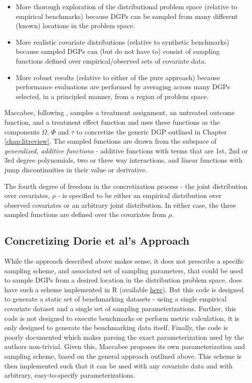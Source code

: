 \documentclass[../main.tex]{subfiles}
\begin{document}
\begin{itemize}
    \item More thorough exploration of the distributional problem space (relative to empirical benchmarks) because DGPs can be sampled from many different (known) locations in the problem space.
    
    \item More realistic covariate distributions (relative to synthetic benchmarks) because sampled DGPs can (but do not have to) consist of sampling functions defined over empirical/observed sets of covariate data.
    
    \item More robust results (relative to either of the pure approach) because performance evaluations are performed by averaging across many DGPs selected, in a principled manner, from a region of problem space.
\end{itemize}

Maccabee, following \cite{Dorie2019Automated1}, samples a treatment assignment, an untreated outcome function, and a treatment effect function and uses these functions as the components $\Omega$, $\Phi$ and $\tau$ to concretize the generic DGP outlined in Chapter \ref{chap:litreview}. The sampled functions are drawn from the subspace of \textit{generalized, additive functions} - additive functions with terms that are 1st, 2nd or 3rd degree polynomials, two or three way interactions, and linear functions with jump discontinuities in their value or derivative.

\vspace{\baselineskip}

The fourth degree of freedom in the concretization process - the joint distribution over covariates, $\rho$ - is specified to be either an empirical distribution over observed covariates or an arbitrary joint distribution. In either case, the three sampled functions are defined over the covariates from $\rho$.

\subsection{Concretizing Dorie et al's Approach}

While the approach described above makes sense, it does not prescribe a specific sampling scheme, and associated set of sampling parameters, that could be used to sample DGPs from a desired location in the distribution problem space. \cite{Dorie2019Automated1} does have such a scheme implemented in R (available \href{https://github.com/vdorie/aciccomp}{here}). But this code is designed to generate a static set of benchmarking datasets - using a single empirical covariate dataset and a single set of sampling parameterizations. Further, this code is not designed to execute benchmarks or perform metric calculation, it is only designed to generate the benchmarking data itself. Finally, the code is poorly documented which makes parsing the exact parameterization used by the authors non-trivial. Given this, Maccabee proposes its own parameterization and sampling scheme, based on the general approach outlined above. This scheme is then implemented such that it can be used with any covariate data and with arbitrary, easy-to-specify parameterizations.
\end{document}
